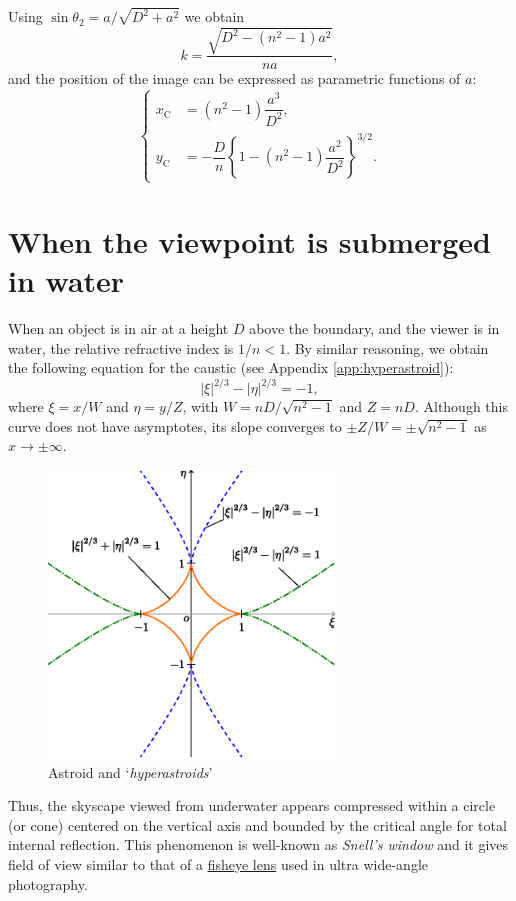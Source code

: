 \documentclass[twocolumn]{article}
\begin{document}
Using 
$\sin\theta_2 = {a}/{\sqrt{D^2+a^2}}$
we obtain
$$k = \dfrac{\sqrt{D^2-(n^2-1)a^2}}{na},$$
and the position of the image can be expressed as parametric functions of $a$:
$$ \left\{ 
\begin{aligned}
	x_{\mathrm{C}}^{} &= (n^2-1)\dfrac{a^3}{D^2},\\
	y_{\mathrm{C}}^{} 
	&=-\dfrac{D}{n}\left\{ 1-(n^2-1)\dfrac{a^2}{D^2} \right\}^{3/2}.
\end{aligned}
\right.$$

\section{When the viewpoint is submerged in water}

When an object is in air at a height $D$ above the boundary, and the viewer is in water, the relative refractive index is $1/n < 1$. By similar reasoning, we obtain the following equation for the caustic (see Appendix \ref{app:hyperastroid}):
$$ \left| \xi \right|^{2/3} - \left| \eta \right|^{2/3} = -1, $$
where $\xi = {x}/{W} $ and $\eta = {y}/{Z}$, with $W = {nD}/{\sqrt{n^2-1}}$ and $Z = nD$. 
Although this curve does not have asymptotes, its slope converges to $\pm Z/W = \pm \sqrt{n^2-1}$ as $x \to \pm\infty$.

\begin{figure}
	\centering
	\includegraphics[width=3in]{figs/g254.eps}
	\caption{Astroid and `\emph{hyperastroids}'}
	\label{fig:hyperastroid}
\end{figure}

Thus, the skyscape viewed from underwater appears compressed within a circle (or cone) centered on the vertical axis and bounded by the critical angle for total internal reflection. This phenomenon is well-known as \emph{Snell's window} and it gives field of view  similar to that of a \href{https://en.wikipedia.org/wiki/Fisheye_lens}{fisheye lens} used in ultra wide-angle photography.
\end{document}
